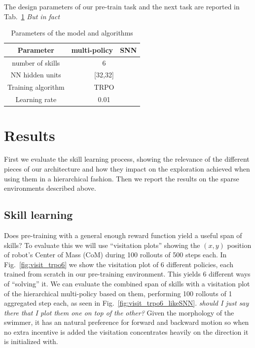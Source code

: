 \documentclass{article} %
\begin{document}
The design parameters of our pre-train task and the next task are reported in Tab.\ \ref{tab:params} \textit{But in fact}

\begin{table}
\centering
\begin{tabular}[t]{ccc}
Parameter & multi-policy & SNN \\
\hline
number of skills & \multicolumn{2}{c}{6}\\
NN hidden units & \multicolumn{2}{c}{[32,32]}\\
Training algorithm & \multicolumn{2}{c}{TRPO}\\
Learning rate & \multicolumn{2}{c}{0.01}\\
\end{tabular}
\caption{Parameters of the model and algorithms}
\label{tab:params}
\end{table}

\section{Results}

First we evaluate the skill learning process, showing the relevance of the different pieces of our architecture and how they impact on the exploration achieved when using them in a hierarchical fashion. Then we report the results on the sparse environments described above.

\subsection{Skill learning}

Does pre-training with a general enough reward function yield a useful span of skills? To evaluate this we will use ``visitation plots'' showing the $(x,y)$ position of robot's Center of Mass (CoM) during 100 rollouts of 500 steps each. In Fig.\ \ref{fig:visit_trpo6} we show the visitation plot of 6 different policies, each trained from scratch in our pre-training environment. This yields 6 different ways of ``solving'' it. We can evaluate the combined span of skills with a visitation plot of the hierarchical multi-policy based on them, performing 100 rollouts of 1 aggregated step each, as seen in Fig.\ \ref{fig:visit_trpo6_likeSNN}. \textit{should I just say there that I plot them one on top of the other?} Given the morphology of the swimmer, it has an natural preference for forward and backward motion so when no extra incentive is added the visitation concentrates heavily on the direction it is initialized with.
\end{document}
